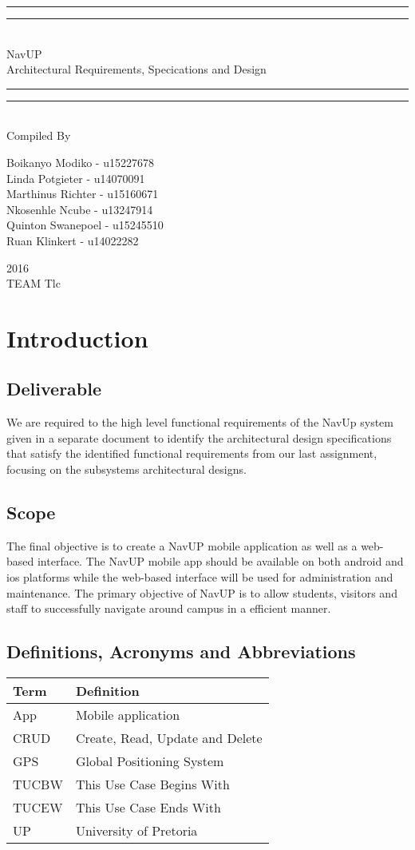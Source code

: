 \documentclass{article}
\newcommand*{\titleGP}{\begingroup
\centering 
\vspace*{\baselineskip}

\rule{\textwidth}{1.6pt}\vspace*{-\baselineskip}\vspace*{2pt}
\rule{\textwidth}{0.4pt}\\[\baselineskip]

{\LARGE NavUP\\ [0.3\baselineskip] Architectural Requirements, Specications and Design } \\ [0.2\baselineskip]
\rule{\textwidth}{0.4pt}\vspace*{-\baselineskip}\vspace{3.2pt}
\rule{\textwidth}{1.6pt}\\[\baselineskip] %



Compiled By \\[\baselineskip]
{\Large Boikanyo Modiko - u15227678 \\
Linda Potgieter - u14070091 \\
Marthinus Richter - u15160671 \\
Nkosenhle Ncube - u13247914 \\ 
Quinton Swanepoel - u15245510 \\
Ruan Klinkert - u14022282\par} 

\vfill

{\scshape 2016} \\[0.3\baselineskip]
{\large TEAM Tlc}\par

\endgroup}
\begin{document}
\titleGP

\newpage

\section{Introduction}

\subsection{Deliverable}
We are required to the high level functional requirements of the NavUp system given in a separate document to identify the architectural design specifications that satisfy the identified functional requirements from our last assignment, focusing on the subsystems architectural designs.
\subsection{Scope}
The final objective is to create a NavUP mobile application as well as a web-based interface. The NavUP mobile app should be available on both android and ios platforms while the web-based interface will be used for administration and maintenance. The primary objective of NavUP is to allow students, visitors and staff to successfully navigate around campus in a efficient manner.

\subsection{Definitions, Acronyms and Abbreviations}

\begin{table}[ht!]
	
	\centering
	\begin{tabular}{|p{4cm}|p{7cm}|}
		\hline
		\textbf{Term} & \textbf{Definition} \\		
		\hline
        App & Mobile application \\
		\hline
		CRUD & Create, Read, Update and Delete \\
		\hline
		GPS & Global Positioning System \\
		\hline
		TUCBW & This Use Case Begins With \\
		\hline
		TUCEW & This Use Case Ends With \\
		\hline
		UP & University of Pretoria \\
		\hline
	\end{tabular}
\end{table}
\end{document}
